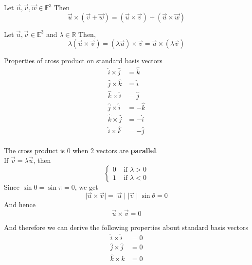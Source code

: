 \begin{theorem}[Distributivity]
	Let $\vec{u}, \vec{v}, \vec{w} \in \mathbb{E}^3$ Then
	\begin{equation}
		\label{eq:cross-product-distributivity}
		\vec{u} \times (\vec{v} + \vec{w}) = (\vec{u} \times \vec{v}) + (\vec{u} \times \vec{w})
	\end{equation}
\end{theorem}

\begin{theorem}
	Let $\vec{u}, \vec{v} \in \mathbb{E}^3$ and $\lambda \in \mathbb{R}$ Then,
	\begin{equation}
		\label{eq:cross-product-multiplication-by-scalar}
		\lambda(\vec{u} \times \vec{v}) = (\lambda\vec{u}) \times \vec{v} = \vec{u} \times (\lambda\vec{v})
	\end{equation}
\end{theorem}

\begin{note}
	Properties of cross product on standard basis vectors
	\begin{align*}
		\hat{i} \times \hat{j} & = \hat{k}  \\
		\hat{j} \times \hat{k} & = \hat{i}  \\
		\hat{k} \times \hat{i} & = \hat{j}  \\
		\hat{j} \times \hat{i} & = -\hat{k} \\
		\hat{k} \times \hat{j} & = -\hat{i} \\
		\hat{i} \times \hat{k} & = -\hat{j} \\
	\end{align*}
\end{note}

\begin{note}
	The cross product is 0 when 2 vectors are {\bf parallel}. \\
	If $\vec{v} = \lambda \vec{u}$, then
	\begin{equation*}
		\begin{cases}
			0   \ \ \ \ \ \text{if } \lambda > 0 \\
			1 \ \ \ \ \ \text{if } \lambda < 0
		\end{cases}
	\end{equation*}
	Since $\sin 0 = \sin \pi = 0$, we get
	$$\mid \vec{u} \times \vec{v} \mid = \mid \vec{u} \mid \mid \vec{v} \mid\sin\theta = 0 $$
	And hence
	$$\vec{u} \times \vec{v} = 0 $$

	And therefore we can derive the following properties about standard basis vectors
	\begin{align*}
		\hat{i} \times \hat{i} & = 0 \\
		\hat{j} \times \hat{j} & = 0 \\
		\hat{k} \times \hat{k} & = 0 \\
	\end{align*}

\end{note}

